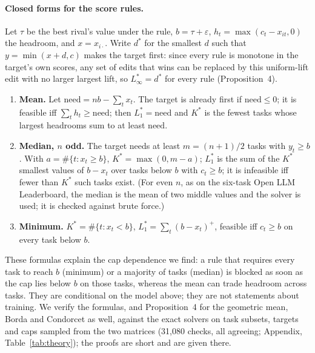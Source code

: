 \paragraph{Closed forms for the score rules.}
Let $\tau$ be the best rival's value under the rule, $b=\tau+\varepsilon$, $h_t=\max(c_t-x_{it},0)$ the headroom, and $x=x_{i\cdot}$.
Write $d^\ast$ for the smallest $d$ such that $y=\min(x+d,c)$ makes the target first: since every rule is monotone in the target's own scores, any set of edits that wins can be replaced by this uniform-lift edit with no larger largest lift, so $L_\infty^\ast=d^\ast$ for every rule (Proposition~4).
\begin{enumerate}\setlength\itemsep{0pt}
\item \textbf{Mean.} Let $\mathrm{need}=nb-\sum_t x_t$. The target is already first if $\mathrm{need}\le 0$; it is feasible iff $\sum_t h_t\ge\mathrm{need}$; then $L_1^\ast=\mathrm{need}$ and $K^\ast$ is the fewest tasks whose largest headrooms sum to at least $\mathrm{need}$.
\item \textbf{Median, $n$ odd.} The target needs at least $m=(n+1)/2$ tasks with $y_t\ge b$. With $a=\#\{t:x_t\ge b\}$, $K^\ast=\max(0,m-a)$; $L_1^\ast$ is the sum of the $K^\ast$ smallest values of $b-x_t$ over tasks below $b$ with $c_t\ge b$; it is infeasible iff fewer than $K^\ast$ such tasks exist. (For even $n$, as on the six-task Open LLM Leaderboard, the median is the mean of two middle values and the solver is used; it is checked against brute force.)
\item \textbf{Minimum.} $K^\ast=\#\{t:x_t<b\}$, $L_1^\ast=\sum_t(b-x_t)^+$, feasible iff $c_t\ge b$ on every task below $b$.
\end{enumerate}
These formulas explain the cap dependence we find: a rule that requires every task to reach $b$ (minimum) or a majority of tasks (median) is blocked as soon as the cap lies below $b$ on those tasks, whereas the mean can trade headroom across tasks.
They are conditional on the model above; they are not statements about training.
We verify the formulas, and Proposition~4 for the geometric mean, Borda and Condorcet as well, against the exact solvers on task subsets, targets and caps sampled from the two matrices (31{,}080 checks, all agreeing; Appendix, Table~\ref{tab:theory}); the proofs are short and are given there.
